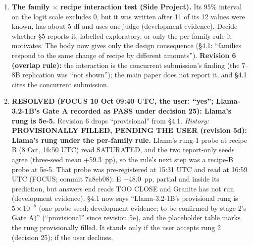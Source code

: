 \documentclass{article}
\theoremstyle{plain}
\theoremstyle{definition}
\theoremstyle{remark}
\begin{document}
\begin{enumerate}
        (both families)'', and no common recipe now exists. OLMo's Gate A of
        record (recipe B) passed ARC under the frozen bars (ARC rose on every
        seed; audit), so the rule decided none of OLMo's main readings; it
        decided the recipe-G Gate A read and the rung-2 readings (reported).
        \textbf{Resolution:} the rule is extended to every family's Gate A read
        at its chosen learning rate, fixed before any such read and disclosed as
        a loosening; it replaces ``at the common recipe'' in the 20:50 UTC
        entry. \S{}4.2 states this scope (revision 5c); the placeholder is gone.
  \item \textbf{The family $\times$ recipe interaction test (Side Project).} Its
        95\% interval on the logit scale excludes 0, but it was written after 11
        of its 12 values were known, has about 5 df and uses one judge
        (development evidence). Decide whether \S{}5 reports it, labelled
        exploratory, or only the per-family rule it motivates. The body now
        gives only the design consequence (\S{}4.1: ``families respond to the
        same change of recipe by different amounts''). \textbf{Revision 6
        (overlap rule):} the interaction is the concurrent submission's finding
        (the 7--8B replication was ``not shown''); the main paper does not
        report it, and \S{}4.1 cites the concurrent submission.
  \item \textbf{RESOLVED (FOCUS 10 Oct 09:40 UTC, the user: ``yes'';
        Llama-3.2-1B's Gate A recorded as PASS under decision 25): Llama's rung
        is 5e-5.} Revision 6 drops ``provisional'' from \S{}4.1. \emph{History:}
        \textbf{PROVISIONALLY FILLED, PENDING THE USER (revision 5d): Llama's
        rung under the per-family rule.} Llama's rung-1 probe at recipe B (8
        Oct, 16:50 UTC) read SATURATED, and the two report-only seeds agree
        (three-seed mean +59.3~pp), so the rule's next step was a recipe-B probe
        at 5e-5. That probe was pre-registered at 15:31 UTC and read at 16:59
        UTC (FOCUS; commit 7a8eb08): E +48.0~pp, partial and inside its
        prediction, but answers end reads TOO CLOSE and Granite has not run
        (development evidence). \S{}4.1 now says ``Llama-3.2-1B's provisional
        rung is $5 \times 10^{-5}$ (one probe seed; development evidence; to be
        confirmed by stage 2's Gate A)'' (``provisional'' since revision 5e),
        and the placeholder table marks the rung provisionally filled. It stands
        only if the user accepts rung 2 (decision 25); if the user declines,

\end{enumerate}
\end{document}
